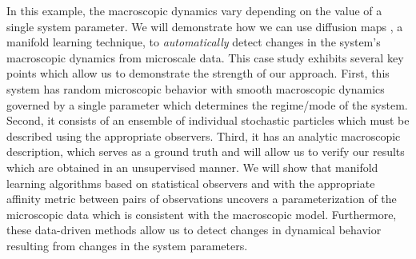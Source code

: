 \documentclass[preprint]{elsarticle}
\begin{document}
In this example, the macroscopic dynamics vary depending on the value of a single system parameter.
%
We will demonstrate how we can use diffusion maps \cite{coifman2005geometric}, a manifold learning technique, to {\em automatically} detect changes in the system's macroscopic dynamics from microscale data.
%
This case study exhibits several key points which allow us to demonstrate the strength of our approach.
%
First, this system has random microscopic behavior with smooth macroscopic dynamics governed by a single parameter which determines the regime/mode of the system. 
%
Second, it consists of an ensemble of individual stochastic particles which must be described using the appropriate observers.
%
Third, it has an analytic macroscopic description, which serves as a ground truth and will allow us to verify our results which are obtained in an unsupervised manner.
%
We will show that manifold learning algorithms based on statistical observers and with the appropriate affinity metric between pairs of observations uncovers a parameterization of the microscopic data which is consistent with the macroscopic model.
%
Furthermore, these data-driven methods allow us to detect changes in dynamical behavior resulting from changes in the system parameters. 

%


\end{document}

